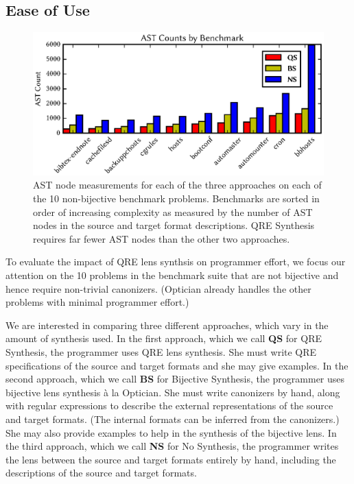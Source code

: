 \documentclass[acmsmall,review,anonymous]{acmart}
\newcommand{\QRESize}{\textbf{QS}}
\newcommand{\canonizeAndSpecSize}{\textbf{BS}}
\newcommand{\LensAndSpecSize}{\textbf{NS}}
\begin{document}
\subsection{Ease of Use}

\begin{figure}[t]
\includegraphics{generated-graphs/asts.eps}
\caption{AST node measurements for each of the three approaches
on each of the 10 non-bijective benchmark problems.
Benchmarks are sorted in order of increasing complexity as measured by
the number of AST nodes in the source and target format descriptions. 
QRE Synthesis requires far fewer AST nodes than the other
two approaches.}
\label{fig:asts}
\end{figure}

To evaluate the impact of QRE lens synthsis on programmer effort,
we focus our attention on the 10 problems in the benchmark suite that
are not bijective and hence require non-trivial canonizers. 
(Optician already handles the other problems with minimal programmer
effort.)

We are interested in comparing three different approaches, which vary
in the amount of synthesis used. 
In the first approach, which we call \QRESize{} for QRE Synthesis, the programmer uses
QRE lens synthesis.  She must write QRE specifications of the source and
target formats and she may give examples.
In the second approach, which we call \canonizeAndSpecSize{} for
Bijective Synthesis, the
programmer uses bijective lens synthesis \`a la Optician.
She must write canonizers by hand, along with 
regular expressions to describe the external
representations of the source and target formats. (The internal
formats can be inferred from the canonizers.) She may also
provide examples to help in the synthesis of the bijective lens.
In the third approach, which we call \LensAndSpecSize{} for No Synthesis, the
programmer writes the lens between the source and target formats
entirely by hand, including the descriptions of the source and target
formats.
\end{document}
